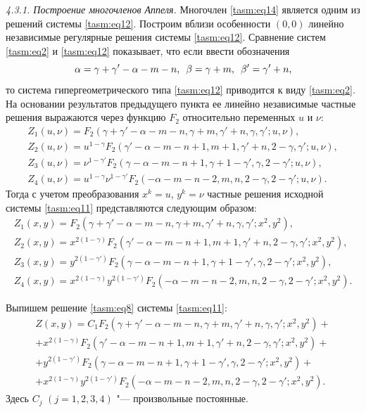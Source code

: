 \textit{4.3.1. Построение многочленов Аппеля.} 
Многочлен \eqref{tasm:eq14} является одним из решений системы \eqref{tasm:eq12}. 
Построим вблизи особенности $(0, 0)$ линейно независимые регулярные решения системы \eqref{tasm:eq12}. 
Сравнение систем \eqref{tasm:eq2} и \eqref{tasm:eq12} показывает, что если ввести
обозначения
$$
\alpha=\gamma+\gamma'-\alpha-m-n,\enskip \beta=\gamma+m,\enskip \beta'=\gamma'+n,
$$
то система гипергеометрического типа \eqref{tasm:eq12} приводится к виду \eqref{tasm:eq2}. 
На основании результатов предыдущего пункта ее линейно независимые частные решения выражаются через функцию
$F_{2}$ относительно переменных $u$ и $\nu$:
$$
\begin{array}{l}
Z_{1}(u,\nu)=F_{2}(\gamma+\gamma'-\alpha-m-n, \gamma+m, \gamma'+n, \gamma, \gamma'; u, \nu),\\[0.2cm]
Z_{2}(u,\nu)=u^{1-\gamma}    F_{2}(\gamma'-\alpha-m-n+1, m+1, \gamma'+n, 2-\gamma, \gamma'; u, \nu),\\[0.2cm]
Z_{3}(u,\nu)=\nu^{1-\gamma'}    F_{2}(\gamma-\alpha-m-n+1, \gamma+1-\gamma', \gamma, 2-\gamma'; u, \nu),\\[0.2cm]
Z_{4}(u,\nu)=u^{1-\gamma}    \nu^{1-\gamma'}   
F_{2}(-\alpha-m-n-2, m, n, 2-\gamma, 2-\gamma'; u, \nu).
\end{array}
$$
Тогда с учетом преобразования $x^{k}=u$, $y^{k}=\nu$ частные решения исходной системы \eqref{tasm:eq11} представляются следующим образом:
$$
\begin{array}{l}
Z_{1}(x,y)=F_{2}(\gamma+\gamma'-\alpha-m-n, \gamma+m, \gamma'+n, \gamma, \gamma'; x^{2}, y^{2}),\\[0.2cm]
Z_{2}(x,y)=x^{2(1-\gamma)}    F_{2}(\gamma'-\alpha-m-n+1, m+1, \gamma'+n, 2-\gamma, \gamma'; x^{2}, y^{2}),\\[0.2cm]
Z_{3}(x,y)=y^{2(1-\gamma')}    F_{2}(\gamma-\alpha-m-n+1, \gamma+1-\gamma', \gamma, 2-\gamma'; x^{2}, y^{2}),\\[0.2cm]
Z_{4}(x,y)=x^{2(1-\gamma)}    y^{2(1-\gamma')}   
F_{2}(-\alpha-m-n-2, m, n, 2-\gamma, 2-\gamma'; x^{2}, y^{2}).
\end{array}
$$

Выпишем решение \eqref{tasm:eq8} системы \eqref{tasm:eq11}:
\begin{multline}
Z(x,y)=C_{1}    F_{2}(\gamma +\gamma'-\alpha-m-n, \gamma+m, \gamma'+
n, \gamma, \gamma'; x^{2}, y^{2})+ \\
+ 
x^{2(1-\gamma)} F_{2}(\gamma'-\alpha
-m-n+1, m+1, \gamma'+n, 2-\gamma, \gamma'; x^{2}, y^{2})+\\ 
+y^{2(1-\gamma')}    F_{2}(\gamma-\alpha-m-n+1,
\gamma+1-\gamma', \gamma, 2-\gamma'; x^{2},
y^{2})+\\
+x^{2(1-\gamma)}    y^{2(1-\gamma')}   
F_{2}(-\alpha-m-n-2, m, n, 2-\gamma, 2-\gamma'; x^{2}, y^{2}).
\end{multline}
Здесь $C_{j}$ $(j=1, 2, 3, 4)$ "--- произвольные постоянные.

